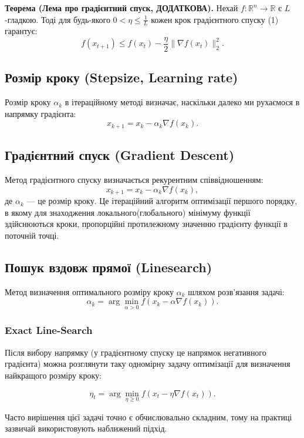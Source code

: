 \documentclass[a4paper,12pt]{article}
\begin{document}
\textbf{Теорема (Лема про градієнтний спуск, ДОДАТКОВА).}  
Нехай \( f: \mathbb{R}^n \to \mathbb{R} \) є \( L \)-гладкою.  
Тоді для будь-якого \( 0 < \eta \leq \frac{1}{L} \) кожен крок градієнтного спуску (1) гарантує:
\[
f(x_{t+1}) \leq f(x_t) - \frac{\eta}{2} \|\nabla f(x_t)\|_2^2.
\]


\subsection{Розмір кроку (Stepsize, Learning rate)}
Розмір кроку $\alpha_k$ в ітераційному методі визначає, наскільки далеко ми рухаємося в напрямку градієнта:
\begin{equation}
    x_{k+1} = x_k - \alpha_k \nabla f(x_k).
\end{equation}

\subsection{Градієнтний спуск (Gradient Descent)}
Метод градієнтного спуску визначається рекурентним співвідношенням:
\begin{equation}
    x_{k+1} = x_k - \alpha_k \nabla f(x_k),
\end{equation}
де $\alpha_k$ — це розмір кроку. Це ітераційний алгоритм оптимізації першого порядку, в якому для знаходження локального(глобального) мінімуму функції здійснюються кроки, пропорційні протилежному значенню градієнту функції в поточній точці.

\subsection{Пошук вздовж прямої (Linesearch)}
Метод визначення оптимального розміру кроку $\alpha_k$ шляхом розв’язання задачі:
\begin{equation}
    \alpha_k = \arg\min_{\alpha > 0} f(x_k - \alpha \nabla f(x_k)).
\end{equation}

\subsubsection{Exact Line-Search}
Після вибору напрямку (у градієнтному спуску це напрямок негативного градієнта) можна розглянути таку одномірну задачу оптимізації для визначення найкращого розміру кроку:

\[
\eta_t = \arg\min_{\eta \geq 0} f(x_t - \eta \nabla f(x_t)).
\]

Часто вирішення цієї задачі точно є обчислювально складним, тому на практиці зазвичай використовують наближений підхід.
\end{document}
